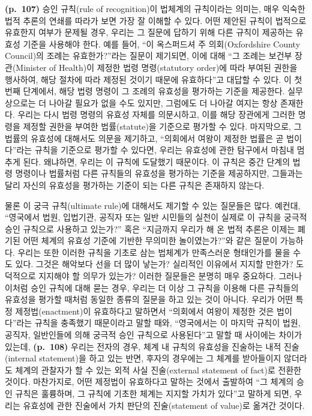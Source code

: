 \textbf{(p.~107)} 승인 규칙(rule of recognition)이 법체계의
 규칙이라는 의미는, 매우 익숙한 법적 추론의
연쇄를 따라가 보면 가장 잘 이해할 수 있다. 어떤 제안된 규칙이 법적으로
유효한지 여부가 문제될 경우, 우리는 그 질문에 답하기 위해 다른 규칙이
제공하는 유효성 기준을 사용해야 한다. 예를 들어, ``이 옥스퍼드셔 주
의회(Oxfordshire County Council)의 조례는 유효한가?''라는 질문이
제기되면, 이에 대해 ``그 조례는 보건부 장관(Minister of Health)이 제정한
법령 명령(statutory order)에 따라 부여된 권한을 행사하여, 해당 절차에
따라 제정된 것이기 때문에 유효하다''고 대답할 수 있다. 이 첫 번째
단계에서, 해당 법령 명령이 그 조례의 유효성을 평가하는 기준을 제공한다.
실무상으로는 더 나아갈 필요가 없을 수도 있지만, 그럼에도 더 나아갈
여지는 항상 존재한다. 우리는 다시 법령 명령의 유효성 자체를 의문시하고,
이를 해당 장관에게 그러한 명령을 제정할 권한을 부여한 법률(statute)을
기준으로 평가할 수 있다. 마지막으로, 그 법률의 유효성에 대해서도 의문을
제기하고, ``의회에서 여왕이 제정한 법률은 곧 법이다''라는 규칙을
기준으로 평가할 수 있다면, 우리는 유효성에 관한 탐구에서 마침내 멈추게
된다. 왜냐하면, 우리는 이 규칙에 도달했기 때문이다. 이 규칙은 중간
단계의 법령 명령이나 법률처럼 다른 규칙들의 유효성을 평가하는 기준을
제공하지만, 그들과는 달리 자신의 유효성을 평가하는 기준이 되는 다른
규칙은 존재하지 않는다.

물론 이 궁극 규칙(ultimate rule)에 대해서도 제기할 수 있는 질문들은
많다. 예컨대, ``영국에서 법원, 입법기관, 공직자 또는 일반 시민들의
실천이 실제로 이 규칙을 궁극적 승인 규칙으로 사용하고 있는가?'' 혹은
``지금까지 우리가 해 온 법적 추론은 이제는 폐기된 어떤 체계의 유효성
기준에 기반한 무의미한 놀이였는가?''와 같은 질문이 가능하다. 우리는 또한
이러한 규칙을 기초로 삼는 법체계가 만족스러운 형태인가를 물을 수도 있다.
그것은 해악보다 선을 더 많이 낳는가? 실리적인 이유에서 지지할 만한가?
도덕적으로 지지해야 할 의무가 있는가? 이러한 질문들은 분명히 매우
중요하다. 그러나 이처럼 승인 규칙에 대해 묻는 경우, 우리는 더 이상 그
규칙을 이용해 다른 규칙들의 유효성을 평가할 때처럼 동일한 종류의 질문을
하고 있는 것이 아니다. 우리가 어떤 특정 제정법(enactment)이 유효하다고
말하면서 ``의회에서 여왕이 제정한 것은 법이다''라는 규칙을 충족했기
때문이라고 말할 때와, ``영국에서는 이 마지막 규칙이 법원, 공직자,
일반인들에 의해 궁극적 승인 규칙으로 사용된다''고 말할 때 사이에는
차이가 있는데, \textbf{(p.~108)} 우리는 전자의 경우, 체계 내 규칙의
유효성을 진술하는 내적 진술(internal statement)을 하고 있는 반면, 후자의
경우에는 그 체계를 받아들이지 않더라도 체계의 관찰자가 할 수 있는 외적
사실 진술(external statement of fact)로 전환한 것이다. 마찬가지로, 어떤
제정법이 유효하다고 말하는 것에서 출발하여 ``그 체계의 승인 규칙은
훌륭하며, 그 규칙에 기초한 체계는 지지할 가치가 있다''고 말하게 되면,
우리는 유효성에 관한 진술에서 가치 판단의 진술(statement of value)로
옮겨간 것이다.

